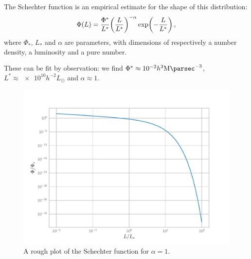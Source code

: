 \documentclass[main.tex]{subfiles}
\begin{document}





The Schechter function is an empirical estimate for the shape of this distribution:
%
\begin{equation}
  \Phi(L) = \frac{\Phi^*}{L^*} \qty(\frac{L}{L^*})^{-\alpha} \exp(-\frac{L}{L^*})
  \,,
\end{equation}
%
where \(\Phi_{*}\), \(L_{*}\) and \(\alpha \) are parameters, with dimensions of respectively a number density, a luminosity and a pure number.

These can be fit by observation: we find \(\Phi^* \approx \SI{e-2}{} h^3 \SI{}{\mega\parsec^{-3}}\), \(L^* \approx \num{e10}h^{-2} L_\odot \) and \(\alpha \approx 1\).

\begin{figure}[ht]
\centering
\includegraphics[width=\textwidth]{figures/Schechter.pdf}
\caption{A rough plot of the Schechter function for \(\alpha = 1\).}
\label{fig:Schechter}
\end{figure}
\end{document}
